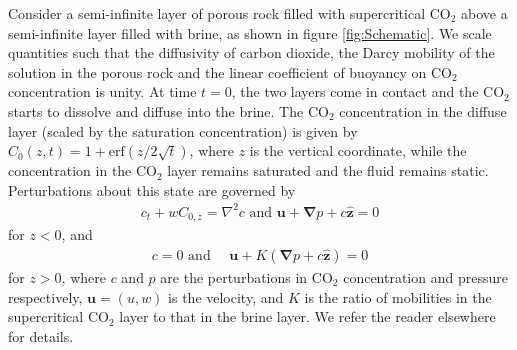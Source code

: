 \documentclass[letterpaper,prl,aps,twocolumn,reprint,superscriptaddress]{revtex4-1}
\newcommand{\cotwo}{CO$_2$ }
\newcommand{\erf}{\text{erf}}
\newcommand{\bu}{\boldsymbol{u}}
\newcommand{\bz}{\hat{\boldsymbol{z}}}
\newcommand{\grad}{\boldsymbol{\nabla}}
\begin{document}
Consider a semi-infinite layer of porous rock filled with supercritical \cotwo above a semi-infinite layer filled with brine, as shown in figure \ref{fig:Schematic}. 
We scale quantities such that the diffusivity of carbon dioxide, the Darcy mobility of the solution in the porous rock and the linear coefficient of buoyancy on \cotwo concentration is unity. 
At time $t=0$, the two layers come in contact and the \cotwo starts to dissolve and diffuse into the brine. 
The \cotwo concentration in the diffuse layer (scaled by the saturation concentration) is given by $C_0(z,t) = 1 + \erf( {z}/{2\sqrt{t}})$, where $z$ is the vertical coordinate, while the concentration in the \cotwo layer remains saturated and the fluid remains static. 
Perturbations about this state are governed by 
\begin{align}
 c_t + w C_{0,z} = \nabla^2 c \text{ and }
 \bu + \grad p + c\bz = 0
 \label{eqn:linone}
\end{align}
for $z<0$, and 
\begin{align}
 c = 0 \text{ and } \quad \bu + K (\grad p + c\bz) = 0
 \label{eqn:lintwo}
\end{align}
for $z>0$, where $c$ and $p$ are the perturbations in \cotwo concentration and pressure respectively, $\bu = (u,w)$ is the velocity, and $K$ is the ratio of mobilities in the supercritical \cotwo layer to that in the brine layer. 
We refer the reader elsewhere\cite{SlimRama10} for details. 
\end{document}
